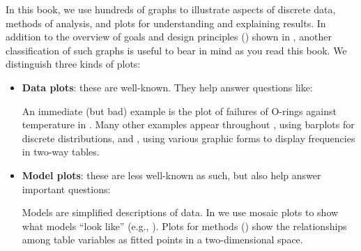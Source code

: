 
In this book, we use hundreds of graphs to illustrate aspects of discrete data,
methods of analysis, and plots for understanding and explaining results.
In addition to the overview of goals and design principles ()
shown in , another classification of such graphs is
useful to bear in mind as you read this book.  We distinguish three kinds of plots:

\begin{itemize}
    \item \textbf{Data plots}: these are well-known. They help answer questions like:

    An immediate (but bad) example is the plot of failures of O-rings against temperature
    in . Many other examples appear throughout ,
    using barplots for discrete distributions, and , using various graphic forms
    to display frequencies in two-way tables.

    \item \textbf{Model plots}: these are less well-known as such, but also help answer important questions:

    Models are simplified descriptions of data.  In  we use mosaic
    plots to show what \loglin models ``look like'' (e.g., ).
    Plots for \ca methods () show the relationships among table variables
    as fitted points in a two-dimensional space.


\end{itemize}
